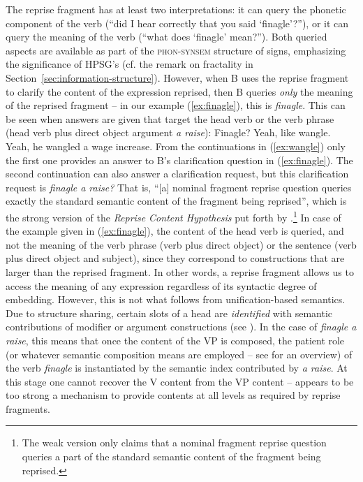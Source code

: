 \documentclass[output=paper
 	        ,biblatex
                ,babelshorthands
                ,newtxmath
                ,draftmode
                ,colorlinks, citecolor=brown
]{langscibook}
\begin{document}
The reprise fragment has at least two interpretations: it can query the phonetic component of the verb (\enquote{did I hear correctly that you said \enquote{finagle}?}), or it can query the meaning of the verb (\enquote{what does \enquote{finagle} mean?}).
%
Both queried aspects are available as part of the \textsc{phon-synsem} structure of signs, emphasizing the significance of HPSG's   (cf. the remark on fractality in Section~\ref{sec:information-structure}).
%
However, when B uses the reprise fragment to clarify the content of the expression reprised, then B queries \emph{only} the meaning of the reprised fragment \citep{Purver:Ginzburg:2004,Ginzburg:Purver:2012} -- in our example (\ref{ex:finagle}), this is \textit{finagle}.
%
This can be seen when answers are given that target the head verb or the verb phrase (head verb plus direct object argument \textit{a raise}):
%
\ea \label{ex:wangle} Finagle?
 \ea Yeah, like wangle.
 \ex Yeah, he wangled a wage increase.
 \z 
\z
%
From the continuations in (\ref{ex:wangle}) only the first one provides an answer to B's clarification question in (\ref{ex:finagle}).
%
The second continuation can also answer a clarification request, but this clarification request is \textit{finagle a raise?}
%
That is, \enquote{[a] nominal fragment reprise question queries exactly the standard semantic content of the fragment being reprised}, which is the strong version of the \emph{Reprise Content Hypothesis}  put forth by \citet[]{Purver:Ginzburg:2004}.\footnote{The weak version \citep[]{Purver:Ginzburg:2004} only claims that a nominal fragment reprise question queries a part of the standard semantic content of the fragment being reprised.}
%
In case of the example given in (\ref{ex:finagle}), the content of the head verb is queried, and not the meaning of the verb phrase (verb plus direct object) or the sentence (verb plus direct object and subject), since they correspond to constructions that are larger than the reprised fragment. 
%
In other words, a reprise fragment allows us to access the meaning of any expression regardless of its syntactic degree of embedding. 
%
However, this is not what follows from unification-based semantics.
%
Due to structure sharing, certain slots of a head are \emph{identified} with semantic contributions of modifier or argument constructions (see  ).
%
In the case of \textit{finagle a raise}, this means that once the content of the VP is composed, the patient role (or whatever semantic composition means are employed -- see  for an overview) of the verb \textit{finagle} is instantiated by the semantic index contributed by \textit{a raise}.
%
At this stage one cannot recover the V content from the VP content --  appears to be too strong a mechanism to provide contents at all levels as required by reprise fragments. 
\end{document}
